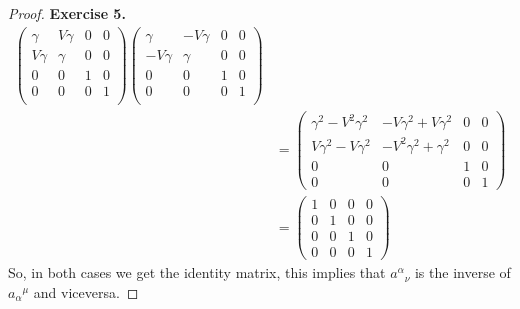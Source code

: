 \documentclass[11pt]{article}
\theoremstyle{definition}
\begin{document}
\begin{proof}{\textbf{Exercise 5.}}
\begin{align*}
\begin{pmatrix}
        \gamma & V\gamma & 0 & 0 \\
        V\gamma & \gamma & 0 & 0 \\
        0 & 0 & 1 & 0 \\
        0 & 0 & 0 & 1 \\
    \end{pmatrix}
    \begin{pmatrix}
        \gamma & -V\gamma & 0 & 0 \\
        -V\gamma & \gamma & 0 & 0 \\
        0 & 0 & 1 & 0 \\
        0 & 0 & 0 & 1 \\
    \end{pmatrix} \\
    &= \begin{pmatrix}
        \gamma^2 -V^2 \gamma^2 & -V\gamma^2 + V\gamma^2 & 0 & 0\\
        V\gamma^2 - V \gamma^2 & -V^2\gamma^2 + \gamma^2 & 0 & 0\\
        0 & 0 & 1 & 0 \\
        0 & 0 & 0 & 1
    \end{pmatrix} \\
    &= \begin{pmatrix}
        1 & 0 & 0 & 0\\
        0 & 1 & 0 & 0\\
        0 & 0 & 1 & 0 \\
        0 & 0 & 0 & 1
    \end{pmatrix}
\end{align*}
So, in both cases we get the identity matrix, this implies that ${a^\alpha}_\nu$
is the inverse of ${a_\alpha}^\mu$ and viceversa.
\end{proof}
\end{document}

